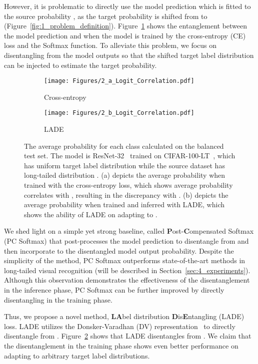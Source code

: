 \documentclass[final]{cvpr}
\begin{document}
However, it is problematic to directly use the model prediction  which is fitted to the source probability , as the target probability  is shifted from  to  (Figure~\ref{fig:1_problem_definition}).
Figure~\ref{fig:2_a_cross_entropy} shows the entanglement between the model prediction and  when the model is trained by the cross-entropy (CE) loss and the Softmax function.
To alleviate this problem, we focus on disentangling  from the model outputs so that the shifted target label distribution  can be injected to estimate the target probability.

\begin{figure}
    \centering
    \begin{subfigure}{0.495\columnwidth}
        \centering
        \texttt{[image: Figures/2\_a\_Logit\_Correlation.pdf]}
        \caption{Cross-entropy}
        \label{fig:2_a_cross_entropy}
    \end{subfigure}
    \begin{subfigure}{0.495\columnwidth}
        \centering
        \texttt{[image: Figures/2\_b\_Logit\_Correlation.pdf]}
        \caption{LADE}
        \label{fig:2_b_lade}
    \end{subfigure}
    \caption{
    The average probability for each class calculated on the balanced test set.
    The model is ResNet-32~\cite{he2016deep} trained on CIFAR-100-LT~\cite{cao2019learning}, which has uniform target label distribution  while the source dataset has long-tailed distribution .
    (a) depicts the average probability when trained with the cross-entropy loss, which shows average probability correlates with , resulting in the discrepancy with .
    (b) depicts the average probability when trained and inferred with LADE, which shows the ability of LADE on adapting to .
    }
    \label{fig:2_logit_correlation}
\end{figure} We shed light on a simple yet strong baseline, called \textbf{P}ost-\textbf{C}ompensated Softmax (PC Softmax) that post-processes the model prediction to disentangle  from  and then incorporate  to the disentangled model output probability.
Despite the simplicity of the method, PC Softmax outperforms state-of-the-art methods in long-tailed visual recognition (will be described in Section~\ref{sec:4_experiments}).
Although this observation demonstrates the effectiveness of the disentanglement in the inference phase, PC Softmax can be further improved by directly disentangling  in the training phase.

Thus, we propose a novel method, \textbf{LA}bel distribution \textbf{D}is\textbf{E}ntangling (LADE) loss.
LADE utilizes the Donsker-Varadhan (DV) representation~\cite{donsker1985large} to directly disentangle  from .
Figure~\ref{fig:2_b_lade} shows that LADE disentangles  from .
We claim that the disentanglement in the training phase shows even better performance on adapting to arbitrary target label distributions.
\end{document}
